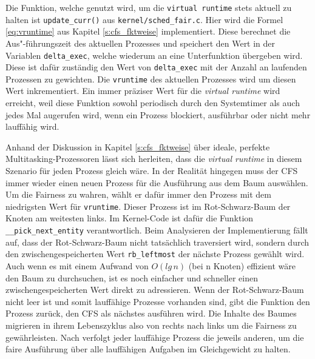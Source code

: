 Die Funktion, welche genutzt wird, um die  \texttt{virtual \- runtime} stets aktuell zu halten ist \texttt{update\_curr()} aus \texttt{kernel/sched\_fair.c}. Hier wird die Formel \ref{eq:vruntime} aus Kapitel \ref{s:cfs_fktweise} implementiert. Diese berechnet die Aus"-führungszeit des aktuellen Prozesses und speichert den Wert in der Variablen \texttt{delta\_exec}, welche wiederum an eine Unterfunktion über\-geben wird. Diese ist dafür zuständig den Wert von \texttt{delta\-\_exec} mit der Anzahl an laufenden Prozessen zu gewichten. Die \texttt{vruntime} des aktuellen Prozesses wird um diesen Wert inkrementiert.  Ein immer präziser Wert für die \textit{virtual runtime} wird erreicht, weil diese Funktion sowohl periodisch durch den Systemtimer als auch jedes Mal augerufen wird, wenn ein Prozess blockiert, ausführbar oder nicht mehr lauffähig wird. 

Anhand der Diskussion in Kapitel \ref{s:cfs_fktweise} über ideale, perfekte Multitasking-Prozessoren lässt sich herleiten, dass die \textit{virtual runtime} in diesem Szenario für jeden Prozess gleich wäre. In der Realität hingegen muss der CFS immer wieder einen neuen Prozess für die Ausführung aus dem Baum auswählen. Um die Fairness zu wahren, wählt er dafür immer den Prozess mit dem niedrigsten Wert für \texttt{vruntime}. Dieser Prozess ist im Rot-Schwarz-Baum der Knoten am weitesten links. Im Kernel-Code ist dafür die Funktion \texttt{\_\_pick\_next\_entity} verantwortlich. Beim \- Analysieren der Implementierung fällt auf, dass der Rot-Schwarz-Baum nicht tatsächlich traversiert wird, sondern durch den zwischengespeicherten Wert \texttt{rb\_leftmost} der nächste Prozess gewählt wird. Auch wenn es mit einem Aufwand von $O(lg\, n)$ (bei n Knoten) effizient wäre den Baum zu durchsuchen, ist es noch einfacher und schneller einen zwischengespeicherten Wert direkt zu adressieren. Wenn der Rot-Schwarz-Baum nicht leer ist und somit lauffähige Prozesse vorhanden sind, gibt die Funktion den Prozess zurück, den CFS als nächstes ausführen wird. Die Inhalte des Baumes migrieren in ihrem Lebenszyklus also von rechts nach links um die Fairness zu gewährleisten. Nach \cite{mjones} verfolgt jeder lauffähige Prozess die jeweils anderen, um die faire Ausführung über alle lauffähigen Aufgaben im Gleichgewicht zu halten.

